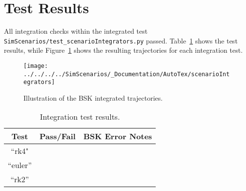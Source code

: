 
\section{Test Results}
All integration checks within the integrated test {\tt SimScenarios/test\_scenarioIntegrators.py} passed.  Table~\ref{tbl:intResults} shows the test results, while Figure~\ref{fig:intResults} shows the resulting trajectories for each integration test.

\begin{figure}[t]
	\centerline{
	\texttt{[image: ../../../../SimScenarios/\_Documentation/AutoTex/scenarioIntegrators]}
	}
	\caption{Illustration of the BSK integrated trajectories.}
	\label{fig:intResults}
\end{figure}

\begin{table}[h]
	\caption{Integration test results.}
	\label{tbl:intResults}
	\centering \fontsize{10}{10}\selectfont
	\begin{tabular}{c | c | p{4in} } %
		\hline\hline
		\textbf{Test} 			& \textbf{Pass/Fail} 	 & \textbf{BSK Error Notes} 									        
		\\ \hline
		``rk4"		  	& 
		      	  &
		
	         \\ \hline
		``euler''	   	           	&
		           		&      
		  
		\\ \hline
		``rk2''      	&
		
		   &  
		
\\ 
		\hline\hline
	\end{tabular}
\end{table}